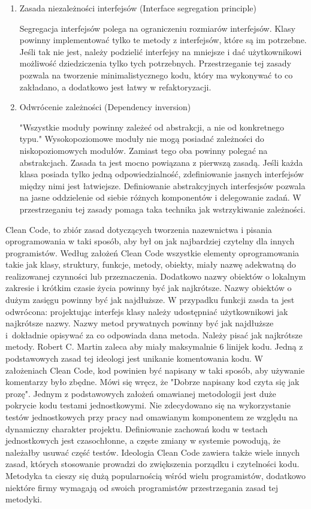 \documentclass[oneside, eng]{mgr}
\begin{document}
\begin{enumerate}
\item Zasada niezależności interfejsów (Interface segregation principle)

Segregacja interfejsów polega na ograniczeniu rozmiarów interfejsów. Klasy powinny implementować tylko te metody z interfejsów, które są im potrzebne. Jeśli tak nie jest, należy podzielić interfejsy na mniejsze i dać użytkownikowi możliwość dziedziczenia tylko tych potrzebnych. Przestrzeganie tej zasady pozwala na tworzenie minimalistycznego kodu, który ma wykonywać to co zakładano, a dodatkowo jest łatwy w refaktoryzacji.

\item Odwrócenie zależności (Dependency inversion)

"Wszystkie moduły powinny zależeć od abstrakcji, a nie od konkretnego typu." Wysokopoziomowe moduły nie mogą posiadać zależności do niskopoziomowych modułów. Zamiast tego oba powinny polegać na abstrakcjach. Zasada ta jest mocno powiązana z pierwszą zasadą. Jeśli każda klasa posiada tylko jedną odpowiedzialność, zdefiniowanie jasnych interfejsów między nimi jest łatwiejsze. Definiowanie abstrakcyjnych interfesjsów pozwala na jasne oddzielenie od siebie różnych komponentów i delegowanie zadań. W przestrzeganiu tej zasady pomaga taka technika jak wstrzykiwanie zależności.

\end{enumerate}

Clean Code, to zbiór zasad dotyczących tworzenia nazewnictwa i pisania oprogramowania w taki sposób, aby był on jak najbardziej czytelny dla innych programistów. Według założeń Clean Code wszystkie elementy oprogramowania takie jak klasy, struktury, funkcje, metody, obiekty, miały nazwę adekwatną do realizowanej czynności lub przeznaczenia. Dodatkowo nazwy obiektów o lokalnym zakresie i krótkim czasie życia powinny być jak najkrótsze. Nazwy obiektów o dużym zasięgu powinny być jak najdłuższe. W przypadku funkcji zasda ta jest odwrócona: projektując interfejs klasy należy udostępniać użytkownikowi jak najkrótsze nazwy. Nazwy metod prywatnych powinny być jak najdłuższe i~dokładnie opisywać za co odpowiada dana metoda. Należy pisać jak najkrótsze metody. Robert C. Martin zaleca aby miały maksymalnie 6 linijek kodu. Jedną z podstawowych zasad tej ideologi jest unikanie komentowania kodu. W założeniach Clean Code, kod powinien być napisany w taki sposób, aby używanie komentarzy było zbędne. Mówi się wręcz, że "Dobrze napisany kod czyta się jak prozę". Jednym z podstawowych założeń omawianej metodologii jest duże pokrycie kodu testami jednostkowymi. Nie zdecydowano się na wykorzystanie testów jednostkowych przy pracy nad omawianym komponentem ze względu na dynamiczny charakter projektu. Definiowanie zachowań kodu w testach jednostkowych jest czasochłonne, a częste zmiany w systemie powodują, że należałby usuwać część testów.  Ideologia Clean Code zawiera także wiele innych zasad, których stosowanie prowadzi do zwiększenia porządku i czytelności kodu. Metodyka ta cieszy się dużą popularnością wśród wielu programistów, dodatkowo niektóre firmy wymagają od swoich programistów przestrzegania zasad tej metodyki.
\end{document}
